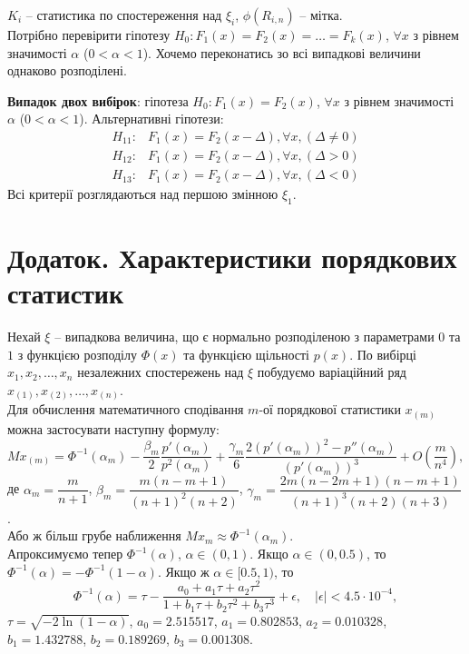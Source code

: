$K_i$ -- статистика по спостереження над $\xi_i$, $\phi(R_{i,n})$ -- мітка. \\

Потрібно перевірити гіпотезу $H_0: F_1(x) = F_2(x) = \ldots = F_k(x)$, $\forall x$ з рівнем значимості $\alpha$ ($0 < \alpha < 1$). Хочемо переконатись зо всі випадкові величини однаково розподілені.

\textbf{Випадок двох вибірок}: гіпотеза $H_0: F_1(x) = F_2(x)$, $\forall x$ з рівнем значимості $\alpha$ ($0 < \alpha < 1$). Альтернативні гіпотези:
\begin{align*}
    H_{11}: & F_1(x) = F_2(x - \Delta), \forall x, (\Delta \ne 0) \\
    H_{12}: & F_1(x) = F_2(x - \Delta), \forall x, (\Delta > 0) \\
    H_{13}: & F_1(x) = F_2(x - \Delta), \forall x, (\Delta < 0)
\end{align*}
Всі критерії розглядаються над першою змінною $\xi_1$.

\section{Додаток. Характеристики порядкових статистик}

Нехай $\xi$ -- випадкова величина, що є нормально розподіленою з параметрами $0$ та $1$ з функцією розподілу $\Phi(x)$ та функцією щільності $p(x)$. По вибірці $x_1, x_2, \ldots, x_n$ незалежних спостережень над $\xi$ побудуємо варіаційний ряд $x_{(1)}, x_{(2)}, \ldots, x_{(n)}$. \\

Для обчислення математичного сподівання $m$-ої порядкової статистики $x_{(m)}$ можна застосувати наступну формулу:
\[ M x_{(m)} = \Phi^{-1}(\alpha_m) - \dfrac{\beta_m}{2} \dfrac{p'(\alpha_m)}{p^2(\alpha_m)} + \dfrac{\gamma_m}{6} \dfrac{2 (p'(\alpha_m))^2 - p''(\alpha_m)}{(p'(\alpha_m))^3} + O \left(\dfrac{m}{n^4}\right), \]
де $\alpha_m = \dfrac{m}{n + 1}$, $\beta_m = \dfrac{m(n-m+1)}{(n+1)^2(n+2)}$, $\gamma_m = \dfrac{2m(n-2m+1)(n-m+1)}{(n+1)^3(n+2)(n+3)}$. \\

Або ж більш грубе наближення $M x_m \approx \Phi^{-1}(\alpha_m)$.  \\

Апроксимуємо тепер $\Phi^{-1}(\alpha)$, $\alpha\in (0, 1)$. Якщо $\alpha \in (0, 0.5)$, то $\Phi^{-1}(\alpha) = - \Phi^{-1}(1 - \alpha)$. Якщо ж $\alpha \in [0.5, 1)$, то \[ \Phi^{-1}(\alpha) = \tau - \dfrac{a_0 + a_1\tau + a_2\tau^2}{1 + b_1\tau + b_2\tau^2 + b_3\tau^3} + \epsilon, \quad |\epsilon| < 4.5 \cdot 10^{-4}, \] $\tau = \sqrt{-2\ln(1-\alpha)}$, $a_0 = 2.515517$, $a_1 = 0.802853$, $a_2 = 0.010328$, $b_1 = 1.432788$, $b_2 = 0.189269$, $b_3 = 0.001308$. \\

